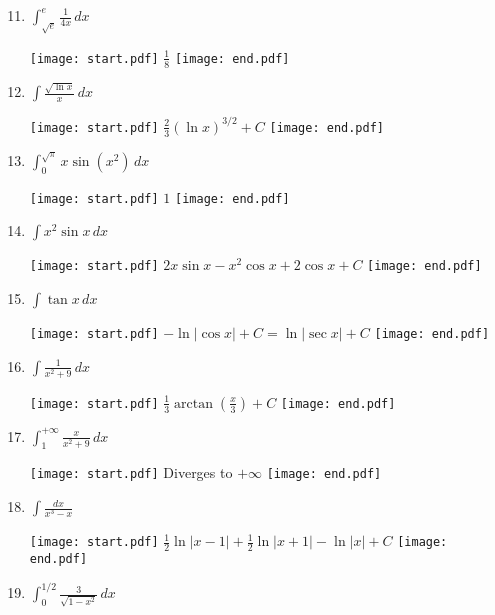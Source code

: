 \documentclass[12pt]{article}
\begin{document}

\begin{enumerate}
\setcounter{enumi}{10}

\item $\int^e_{\sqrt{e}} \frac{1}{4x} \,dx$ 

\texttt{[image: start.pdf]}
{{$\frac{1}{8}$}}
\texttt{[image: end.pdf]}


\item $\int \frac{\sqrt{\ln{x}}}{x} \,dx$ 

\texttt{[image: start.pdf]}
{{$\frac{2}{3}\left(\ln{x}\right)^{3/2}+C$}}
\texttt{[image: end.pdf]}


\item $\int^{\sqrt{\pi}}_{0} x\sin(x^2) \,dx$ 

\texttt{[image: start.pdf]}
{{$1$}}
\texttt{[image: end.pdf]}


\item $\int x^2 \sin{x} \,dx$ 

\texttt{[image: start.pdf]}
{{$2x\sin{x}-x^2\cos{x}+2\cos{x}+C$}}
\texttt{[image: end.pdf]}


\item $\int \tan{x} \,dx$ 

\texttt{[image: start.pdf]}
{{$-\ln{|\cos{x}|}+C=\ln|\sec{x}|+C$}}
\texttt{[image: end.pdf]}


\item $\int \frac{1}{x^2+9} \,dx$

\texttt{[image: start.pdf]}
{{$\frac{1}{3}\arctan\left(\frac{x}{3}\right)+C$}}
\texttt{[image: end.pdf]}


\item $\int^{+\infty}_1 \frac{x}{x^2+9} \,dx$

\texttt{[image: start.pdf]}
{{Diverges to $+\infty$}}
\texttt{[image: end.pdf]}


\item $\int \frac{dx}{x^3-x}$

\texttt{[image: start.pdf]}
{{$\frac{1}{2}\ln|x-1|+\frac{1}{2}\ln|x+1|-\ln|x|+C$}}
\texttt{[image: end.pdf]}


\item $\int^{1/2}_0 \frac{3}{\sqrt{1-x^2}} \,dx$


\end{enumerate}
\end{document}
